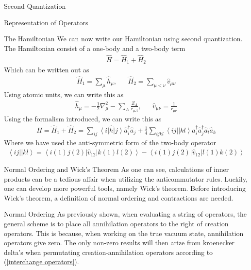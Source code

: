 \documentclass[twoside,english]{uiofysmaster}
\begin{document}
\begin{chapter}{Second Quantization}
\begin{section}{Representation of Operators}
		\begin{subsection}{The Hamiltonian}
			We can now write our Hamiltonian using second quantization. The Hamiltonian consist of a one-body and a two-body term
			\begin{align}
				\hat H = \hat H_1 + \hat H_2
			\end{align}
			Which can be written out as
			\begin{align}
				\hat H_1 = \sum_\mu \hat h_\mu, \:\;\;\;\;\; \hat H_2 = \sum_{\mu < \nu} \hat v_{\mu \nu}
			\end{align}
			Using atomic units, we can write this as
			\begin{align}
				\hat h_\mu = -\frac{1}{2}\nabla_\mu^2 - \sum_A \frac{Z_A}{r_{\mu A}}, \:\;\;\;\;\; \hat v_{\mu \nu} = \frac{1}{r_{\mu \nu}}
			\end{align}
			Using the formalism introduced, we can write this as
			\begin{align}
				\hat H = \hat H_1 + \hat H_2 = \sum_{ij} \left<i \right| \hat h \left| j \right> \hat a_i^\dagger \hat a_j 
						+ \frac{1}{4} \sum_{ijkl} \left<ij|| kl \right> \hat a_i^\dagger \hat a_j^\dagger \hat a_l \hat a_k
			\end{align}
			Where we have used the anti-symmetric form of the two-body operator
			\begin{align}
				\left<ij|| kl \right> = \left< i(1) j(2) \right| \hat v_{12} \left| k(1) l(2) \right> - \left< i(1) j(2) \right| \hat v_{12} \left| l(1) k(2) \right>
			\end{align}
		\end{subsection}

	\end{section}

	\begin{section}{Normal Ordering and Wick's Theorem}
		As one can see, calculations of inner products can be a tedious affair when utilizing the anticommutator rules. Luckily, one can develop more powerful tools, namely Wick's theorem. Before introducing Wick's theorem, a definition of normal ordering and contractions are needed.
		\begin{subsection}{Normal Ordering}
			As previously shown, when evaluating a string of operators, the general scheme is to place all annihilation operators to the right of creation operators. This is because, when working on the true vacuum state, annihilation operators give zero. The only non-zero results will then arize from kroenecker delta's when permutating creation-annihilation operators according to (\ref{interchange operators}). 


\end{subsection}
\end{section}
\end{chapter}
\end{document}
